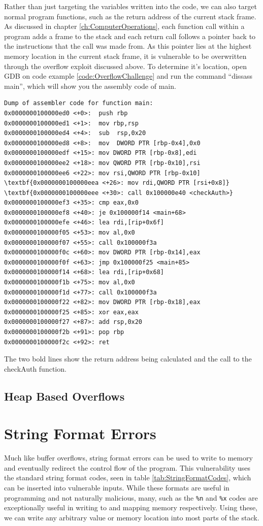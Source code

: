 \documentclass[a4paper,11pt]{report}
\begin{document}
			Rather than just targeting the variables written into the code, we can also target normal program functions,
			such as the return address of the current stack frame. 
			As discussed in chapter \ref{ch:ComputerOperations}, 
			each function call within a program adds a frame to the stack and each return call follows a pointer back to the instructions that the call was made from. 
			As this pointer lies at the highest memory location in the current stack frame, it is vulnerable to be overwritten through the overflow exploit discussed above. 
			To determine it's location, open GDB on code example \ref{code:OverflowChallenge} and run the command ``dissass main'', which will show you the assembly code of main. 
		\begin{Verbatim}[commandchars=\\\{\}]
Dump of assembler code for function main:
0x0000000100000ed0 <+0>:  push rbp
0x0000000100000ed1 <+1>:  mov rbp,rsp
0x0000000100000ed4 <+4>:  sub  rsp,0x20
0x0000000100000ed8 <+8>:  mov  DWORD PTR [rbp-0x4],0x0
0x0000000100000edf <+15>: mov DWORD PTR [rbp-0x8],edi
0x0000000100000ee2 <+18>: mov QWORD PTR [rbp-0x10],rsi
0x0000000100000ee6 <+22>: mov rsi,QWORD PTR [rbp-0x10]
\textbf{0x0000000100000eea <+26>: mov rdi,QWORD PTR [rsi+0x8]}
\textbf{0x0000000100000eee <+30>: call 0x100000e40 <checkAuth>}
0x0000000100000ef3 <+35>: cmp eax,0x0
0x0000000100000ef8 <+40>: je 0x100000f14 <main+68>
0x0000000100000efe <+46>: lea rdi,[rip+0x6f]        
0x0000000100000f05 <+53>: mov al,0x0
0x0000000100000f07 <+55>: call 0x100000f3a
0x0000000100000f0c <+60>: mov DWORD PTR [rbp-0x14],eax
0x0000000100000f0f <+63>: jmp 0x100000f25 <main+85>
0x0000000100000f14 <+68>: lea rdi,[rip+0x68]        
0x0000000100000f1b <+75>: mov al,0x0
0x0000000100000f1d <+77>: call 0x100000f3a
0x0000000100000f22 <+82>: mov DWORD PTR [rbp-0x18],eax
0x0000000100000f25 <+85>: xor eax,eax
0x0000000100000f27 <+87>: add rsp,0x20
0x0000000100000f2b <+91>: pop rbp
0x0000000100000f2c <+92>: ret
		\end{Verbatim}
		The two bold lines show the return address being calculated and the call to the checkAuth function. %
		\subsection{Heap Based Overflows}
		
	\section{String Format Errors}
		Much like buffer overflows, string format errors can be used to write to memory and eventually redirect the control flow of the program. 
		This vulnerability uses the standard string format codes, seen in table \ref{tab:StringFormatCodes}, which can be inserted into vulnerable inputs. 
		While these formats are useful in programming and not naturally malicious, many, such as the \verb+%n+ and \verb+%x+ codes are exceptionally useful in writing to and mapping memory respectively. 
		Using these, we can write any arbitrary value or memory location into most parts of the stack.
		
\end{document}
